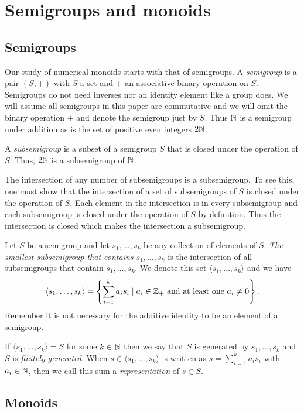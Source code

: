 \chapter{Semigroups and monoids}

\section{Semigroups}

Our study of numerical monoids starts with that of semigroups. A \emph{semigroup} is a pair $(S, +)$ with $S$ a set and $+$ an associative binary operation on $S$. Semigroups do not need inverses nor an identity element like a group does. We will assume all semigroups in this paper are commutative and we will omit the binary operation $+$ and denote the semigroup just by $S$. Thus $\mathbb{N}$ is a semigroup under addition as is the set of positive even integers $2\mathbb{N}$.

A \emph{subsemigroup} is a subset of a semigroup $S$ that is closed under the operation of $S$. Thus, $2\mathbb{N}$ is a subsemigroup of $\mathbb{N}$. 

The intersection of any number of subsemigroups is a subsemigroup. To see this, one must show that the intersection of a set of subsemigroups of $S$ is closed under the operation of $S$. Each element in the intersection is in every subsemigroup and each subsemigroup is closed under the operation of $S$ by definition. Thus the intersection is closed which makes the intersection a subsemigroup.

Let $S$ be a semigroup and let $s_1, \ldots, s_k$ be any collection of elements of $S$. \emph{The smallest subsemigroup that contains $s_1, \ldots, s_k$} is the intersection of all subsemigroups that contain $s_1, \ldots, s_k$. We denote this set $\langle s_1, \ldots, s_k \rangle$ and we have
\[
	\langle s_1, \ldots, s_k \rangle = \left \{\sum_{i = 1}^{k} a_i s_i \mid a_i \in \mathbb{Z}_+  \text{ and at least one } a_i \neq 0 \right \}.
\]
Remember it is not necessary for the additive identity to be an element of a semigroup. 

If $\langle s_1, \ldots, s_k \rangle = S$ for some $k \in \mathbb N$ then we say that $S$ is generated by $s_1, \ldots, s_k$ and $S$ is \emph{finitely generated}. When $s \in \langle s_1, \ldots, s_k \rangle$ is written as $s = \sum_{i = 1}^{k} a_is_i$ with $a_i\in\mathbb N$, then we call this sum a \textit{representation} of $s \in S$.

\section{Monoids}

